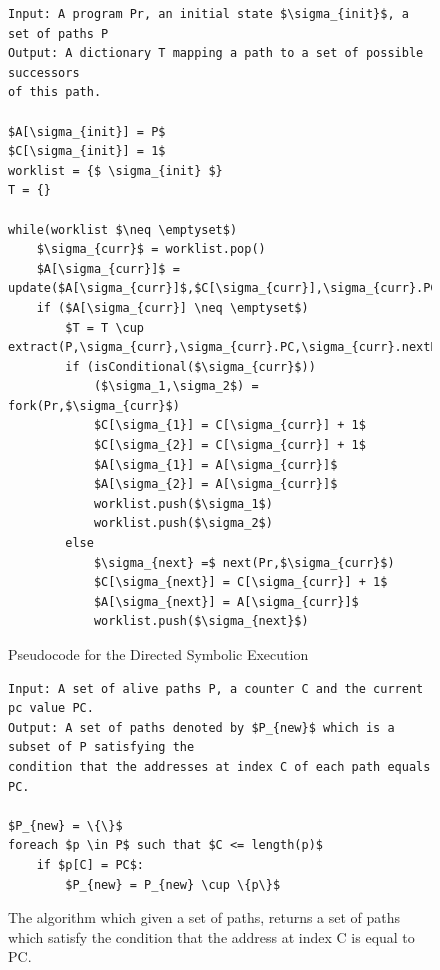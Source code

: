 \documentclass{kththesis}
\begin{document}
\begin{figure}[!htbp]
    \centering
\begin{lstlisting}[style=algorithm]
Input: A program Pr, an initial state $\sigma_{init}$, a set of paths P
Output: A dictionary T mapping a path to a set of possible successors 
of this path.

$A[\sigma_{init}] = P$
$C[\sigma_{init}] = 1$
worklist = {$ \sigma_{init} $}
T = {}

while(worklist $\neq \emptyset$)
    $\sigma_{curr}$ = worklist.pop()
    $A[\sigma_{curr}]$ = update($A[\sigma_{curr}]$,$C[\sigma_{curr}],\sigma_{curr}.PC$)
    if ($A[\sigma_{curr}] \neq \emptyset$)
        $T = T \cup extract(P,\sigma_{curr},\sigma_{curr}.PC,\sigma_{curr}.nextPC,C[\sigma_{curr}])$
        if (isConditional($\sigma_{curr}$))
            ($\sigma_1,\sigma_2$) = fork(Pr,$\sigma_{curr}$)
            $C[\sigma_{1}] = C[\sigma_{curr}] + 1$
            $C[\sigma_{2}] = C[\sigma_{curr}] + 1$
            $A[\sigma_{1}] = A[\sigma_{curr}]$
            $A[\sigma_{2}] = A[\sigma_{curr}]$
            worklist.push($\sigma_1$)
            worklist.push($\sigma_2$)
        else
            $\sigma_{next} =$ next(Pr,$\sigma_{curr}$)
            $C[\sigma_{next}] = C[\sigma_{curr}] + 1$
            $A[\sigma_{next}] = A[\sigma_{curr}]$
            worklist.push($\sigma_{next}$)
\end{lstlisting}
\caption[Pseudocode for the Directed Symbolic Execution]{Pseudocode for the Directed Symbolic Execution}
    \label{fig:DSEAlgorithm}
\end{figure}


\begin{figure}[!htbp]
    \centering
\begin{lstlisting}[style=algorithm]
Input: A set of alive paths P, a counter C and the current pc value PC. 
Output: A set of paths denoted by $P_{new}$ which is a subset of P satisfying the
condition that the addresses at index C of each path equals PC.

$P_{new} = \{\}$
foreach $p \in P$ such that $C <= length(p)$
    if $p[C] = PC$:
        $P_{new} = P_{new} \cup \{p\}$
\end{lstlisting}
\caption[The algorithm which given a set of paths, returns a set of paths which satisfy the condition that the address at index C is equal to PC.]{The algorithm which given a set of paths, returns a set of paths which satisfy the condition that the address at index C is equal to PC.}
    \label{fig:DSEupdate}
\end{figure}
\end{document}
